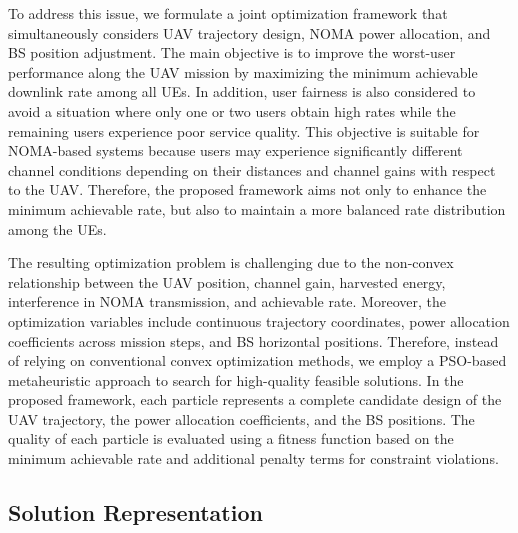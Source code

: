 \documentclass[conference]{IEEEtran}
\begin{document}
To address this issue, we formulate a joint optimization framework that simultaneously considers UAV trajectory design, NOMA power allocation, and BS position adjustment. The main objective is to improve the worst-user performance along the UAV mission by maximizing the minimum achievable downlink rate among all UEs. In addition, user fairness is also considered to avoid a situation where only one or two users obtain high rates while the remaining users experience poor service quality. This objective is suitable for NOMA-based systems because users may experience significantly different channel conditions depending on their distances and channel gains with respect to the UAV. Therefore, the proposed framework aims not only to enhance the minimum achievable rate, but also to maintain a more balanced rate distribution among the UEs.

The resulting optimization problem is challenging due to the non-convex relationship between the UAV position, channel gain, harvested energy, interference in NOMA transmission, and achievable rate. Moreover, the optimization variables include continuous trajectory coordinates, power allocation coefficients across mission steps, and BS horizontal positions. Therefore, instead of relying on conventional convex optimization methods, we employ a PSO-based metaheuristic approach to search for high-quality feasible solutions. In the proposed framework, each particle represents a complete candidate design of the UAV trajectory, the power allocation coefficients, and the BS positions. The quality of each particle is evaluated using a fitness function based on the minimum achievable rate and additional penalty terms for constraint violations.
\subsection{Solution Representation}
\label{subsec:solution_representation}
\end{document}

